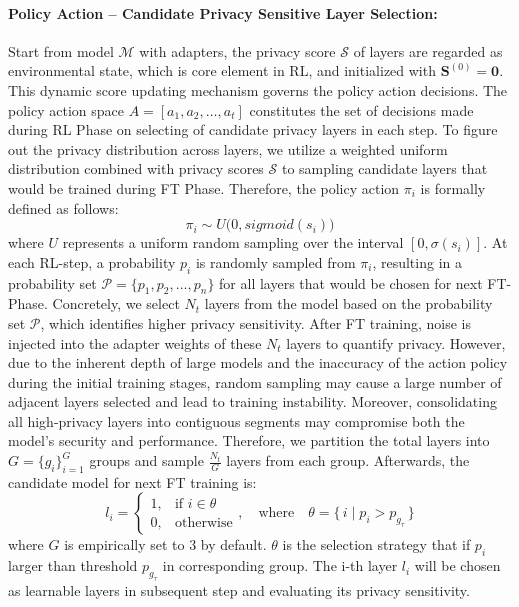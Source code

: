 \documentclass{article}
\begin{document}
\paragraph{ Policy Action -- Candidate Privacy Sensitive Layer Selection:}
Start from model $\mathcal{M}$ with adapters, the privacy score $\mathcal{S}$ of layers are regarded as environmental state, which is core element in RL, and initialized with $\mathbf{S}^{(0)} = \mathbf{0}$. This dynamic score updating mechanism governs the policy action decisions. The policy action space $A = [a_1,a_2,\ldots,a_t]$ constitutes the set of decisions made during RL Phase on selecting of candidate privacy layers in each step. To figure out the privacy distribution across layers, we utilize a weighted uniform distribution combined with privacy scores $\mathcal{S}$ to sampling candidate layers that would be trained during FT Phase. Therefore, the policy action $\pi_i$ is formally defined as follows:
\begin{equation}
\pi_i \sim U\bigl(0, sigmoid(s_i)\bigr)
\label{eq:pi_distribution}
\end{equation}
where $U$ represents a uniform random sampling over the interval $[0, \sigma(s_i)]$. At each RL-step, a probability $p_i$ is randomly sampled from $\pi_i$, resulting in a probability set $\mathcal{P} = \{p_1, p_2, \dots, p_n\}$ for all layers that would be chosen for next FT-Phase. Concretely, we select $N_t$ layers from the model based on the probability set $\mathcal{P}$, which identifies higher privacy sensitivity. After FT training, noise is injected into the adapter weights of these $N_t$ layers to quantify privacy. However, due to the inherent depth of large models and the inaccuracy of the action policy during the initial training stages, random sampling may cause a large number of adjacent layers selected and lead to training instability. Moreover, consolidating all high-privacy layers into contiguous segments may compromise both the model's security and performance. Therefore, we partition the total layers into $G = \{g_i\}_{i=1}^{G}$ groups and sample $\frac{N_t}{G}$ layers from each group. 
Afterwards, the candidate model for next FT training is:
\begin{equation}
    l_i = 
    \begin{cases}
        1, & \text{if } i \in \theta \\[4pt]
        0, & \text{otherwise}
    \end{cases}, \quad \text{where} \quad \theta = \{\, i \mid p_i > p_{g_{\tau}} \,\}
    \label{eq:ahp_definition}
\end{equation}
where $G$ is empirically set to 3 by default. $\theta$ is the selection strategy that if $p_i$ larger than threshold $p_{g_{\tau}}$ in corresponding group. The i-th layer $l_i$ will be chosen as learnable layers in subsequent step and evaluating its privacy sensitivity.
\end{document}
